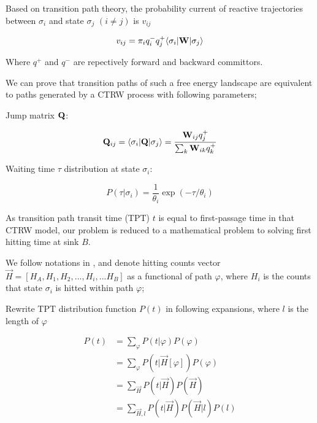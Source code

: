 \documentclass[11pt, a4paper]{article}
\begin{document}
Based on transition path theory, the probability current of reactive trajectories between $\sigma_i$ and state $\sigma_j$ $(i \neq j)$ is $v_{ij}$

\begin{equation}
  v_{ij}=\pi_i q_i^- q_j^+ \langle \sigma_i | \bold{W} | \sigma_j \rangle
\end{equation}

Where $q^+$ and $q^-$ are repectively forward and backward committors.

We can prove that transition paths of such a free energy landscape are equivalent to paths generated by a CTRW process with following parameters;

Jump matrix $\bold{Q}$:

\begin{equation}
  \bold{Q}_{ij}=\langle \sigma_i | \bold{Q} | \sigma_j \rangle = \frac{\bold{W}_{ij} q_j^+}{\sum_k \bold{W}_{ik} q_k^+}
\end{equation}

Waiting time $\tau$ distribution at state $\sigma_i$:

\begin{equation}
  P(\tau|\sigma_i)=\frac{1}{\theta_i}\exp(-\tau/\theta_i)
\end{equation}

As transition path transit time (TPT) $t$ is equal to first-passage time in that CTRW model, our problem is reduced to a mathematical problem to solving first hitting time at sink $B$.

We follow notations in \cite{Manhart2015}, and denote hitting counts vector $\vec{H}=[H_A, H_1, H_2,..., H_i, ...H_B ]$ as a functional of path $\varphi$,
 where $H_i$ is the counts that state $\sigma_i$ is hitted within path $\varphi$;

Rewrite TPT distribution function $P(t)$ in following expansions, where $l$ is the length of $\varphi$

\begin{equation}
  \begin{split}
    P(t)&=\sum_{\varphi} P(t|\varphi)P(\varphi)\\
        &=\sum_{\varphi} P(t|\vec{H}[\varphi])P(\varphi)\\
        &=\sum_{\vec{H}} P(t|\vec{H})P(\vec{H})\\
        &=\sum_{\vec{H},l} P(t|\vec{H})P(\vec{H}|l)P(l)
  \end{split}
\end{equation}
\end{document}
